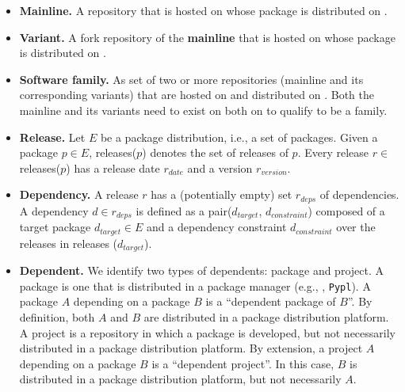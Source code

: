 \begin{itemize}
    \item \textbf{Mainline.} A repository that is hosted on \scp whose package is distributed on \npm.

    \item \textbf{Variant.} A fork repository of the \textbf{mainline} that is hosted on \scp whose package is distributed on \npm.

    \item \textbf{Software family.} As set of two or more repositories (mainline and its corresponding variants) that are hosted on \scp and distributed on \npm. Both the mainline and its variants need to exist on both on \np to qualify to be a family.

    \item \textbf{Release.} Let $E$ be a package distribution, i.e., a set of packages. Given a package $p\in E$, releases($p$) denotes the set of releases of $p$. Every release $r\in$ releases($p$) has a release date $r_{date}$ and a version $r_{version}$.

     \item \textbf{Dependency.} A release $r$ has a (potentially empty) set $r_{deps}$ of dependencies. A dependency $d \in r_{deps}$ is defined as a pair($d_{target}$, $d_{constraint}$) composed of a target package $d_{target} \in E$ and a dependency constraint $d_{constraint}$ over the releases in releases ($d_{target}$).

    \item \textbf{Dependent.} We identify two types of dependents: package and project. A package is one that is distributed in a package manager (e.g., \np, \texttt{Pypl}). A package $A$ depending on a package $B$ is a ``dependent package of $B$''. By definition, both $A$ and $B$ are distributed in a package distribution platform. A project is a repository in which a package is developed, but not necessarily distributed in a package distribution platform. By extension, a project $A$ depending on a package $B$ is a ``dependent project''. In this case, $B$ is distributed in a package distribution platform, but not necessarily $A$.

\end{itemize}


